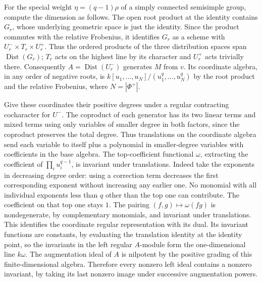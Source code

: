 \documentclass[11pt,a4paper,openany,oneside]{book}
\theoremstyle{resultstyle}
\theoremstyle{definition}
\numberwithin{equation}{chapter}
\begin{document}
For the special weight \(\eta=(q-1)\rho\) of a simply
connected semisimple group, compute the dimension as follows.
The open root product at the identity contains \(G_r\),
whose underlying geometric space is just the identity.
Since the product commutes with the relative Frobenius,
it identifies \(G_r\) as a scheme with
\(U^-_r\times T_r\times U^+_r\). Thus the ordered products
of the three distribution spaces span
\(\operatorname{Dist}(G_r)\); \(T_r\) acts on the highest
line by its character and \(U^+_r\) acts trivially there.
Consequently \(A=\operatorname{Dist}(U^-_r)\) generates
\(M\) from \(v\). Its coordinate algebra, in any order
of negative roots, is \(k[u_1,\ldots,u_N]/(u_1^q,\ldots,u_N^q)\)
by the root product and the relative Frobenius, where
\(N=|\Phi^+|\).

Give these coordinates their positive degrees under a regular
contracting cocharacter for \(U^-\).
The coproduct of each generator has its two linear terms
and mixed terms using only variables of smaller degree
in both factors, since the coproduct preserves the total
degree. Thus translations on the coordinate algebra send
each variable to itself plus a polynomial in smaller-degree
variables with coefficients in the base algebra.
The top-coefficient functional \(\omega\), extracting the
coefficient of \(\prod_i u_i^{q-1}\), is invariant under
translations. Indeed take the exponents in decreasing
degree order: using a correction term decreases the
first corresponding exponent without increasing any
earlier one. No monomial with all individual exponents
less than \(q\) other than the top one can contribute.
The coefficient on that top one stays \(1\).
The pairing \((f,g)\mapsto\omega(fg)\) is nondegenerate, by
complementary monomials, and invariant under translations.
This identifies the coordinate regular representation with
its dual. Its invariant functions are constants, by evaluating
the translation identity at the identity point, so the
invariants in the left regular \(A\)-module form the
one-dimensional line \(k\omega\). The augmentation ideal
of \(A\) is nilpotent by the positive grading of this
finite-dimensional algebra. Therefore every nonzero left
ideal contains a nonzero invariant, by taking its last
nonzero image under successive augmentation powers.
\end{document}
